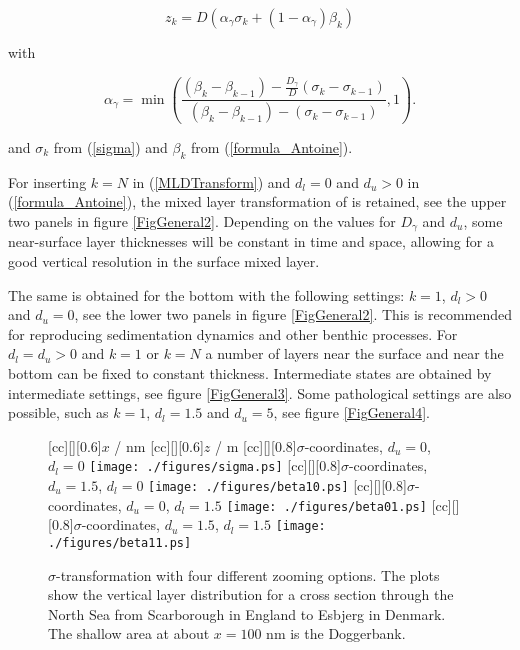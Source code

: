 \begin{equation}\label{HJVTrans}
z_k = D\left(\alpha_{\gamma} \sigma_k + (1-\alpha_{\gamma}) \beta_k\right) 
\end{equation}

with 

\begin{equation}\label{MLDTransform}
\alpha_{\gamma} = \min\left(\frac{
(\beta_k-\beta_{k-1})-\frac{D_{\gamma}}{D}(\sigma_k-\sigma_{k-1})}
{(\beta_k-\beta_{k-1})-(\sigma_k-\sigma_{k-1})},1\right).
\end{equation}

and $\sigma_k$ from (\ref{sigma}) and  $\beta_k$ from (\ref{formula_Antoine}). 

For inserting $k=N$ in (\ref{MLDTransform}) and $d_l=0$ and $d_u>0$
in (\ref{formula_Antoine}), 
the mixed layer transformation of 
\cite{BURCHARDea97} is retained, see the upper two
panels in figure \ref{FigGeneral2}. 
Depending on the values for 
$D_{\gamma}$ and  $d_u$, some near-surface layer thicknesses
will be constant in time and space, allowing for
a good vertical resolution in the surface mixed layer. 

The same is obtained for the bottom with the following settings:
$k=1$, $d_l>0$ and $d_u=0$, see the lower two
panels in figure \ref{FigGeneral2}. This is recommended for reproducing 
sedimentation dynamics and other benthic processes.
For $d_l=d_u>0$ and $k=1$ or $k=N$ a
number of layers near the surface and near the bottom can be
fixed to constant thickness. 
Intermediate states are obtained by intermediate settings,
see figure \ref{FigGeneral3}. 
Some pathological
settings are also possible, such as $k=1$, $d_l=1.5$ and $d_u=5$,
see figure \ref{FigGeneral4}. 


\begin{figure}
\begin{center}
[cc][][0.6]{$x$ / nm}
[cc][][0.6]{$z$ / m}
[cc][][0.8]{$\sigma$-coordinates, $d_u=0$, $d_l=0$}
\texttt{[image: ./figures/sigma.ps]}
[cc][][0.8]{$\sigma$-coordinates, $d_u=1.5$, $d_l=0$}
\texttt{[image: ./figures/beta10.ps]}
[cc][][0.8]{$\sigma$-coordinates, $d_u=0$, $d_l=1.5$}
\texttt{[image: ./figures/beta01.ps]}
[cc][][0.8]{$\sigma$-coordinates, $d_u=1.5$, $d_l=1.5$}
\texttt{[image: ./figures/beta11.ps]}
\caption{
$\sigma$-transformation with four different zooming options. The plots
show the 
vertical layer distribution for a cross section through the North Sea
from Scarborough in England to Esbjerg in Denmark. The shallow area at
about $x=100$ nm is the Doggerbank. 
}\label{FigGeneral1}
\end{center}
\end{figure}

